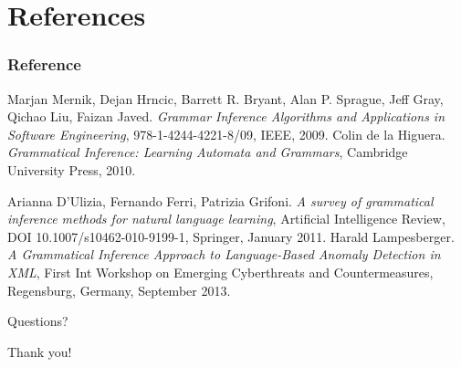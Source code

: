 \documentclass[11pt]{beamer}
\begin{document}
\section{References}

\begin{frame}[allowframebreaks]
  \frametitle<presentation>{Reference}
  \small
  \begin{thebibliography}{10}
    \beamertemplatebookbibitems
   Marjan Mernik, Dejan Hrncic, Barrett R. Bryant,
    Alan P. Sprague, Jeff Gray, Qichao Liu, Faizan Javed.
    \emph{Grammar Inference Algorithms and Applications in Software
      Engineering}, 978-1-4244-4221-8/09, IEEE, 2009.
   Colin de la Higuera.
    \emph{Grammatical Inference: Learning Automata and Grammars},
    Cambridge University Press, 2010.
 
    \beamertemplatearticlebibitems

   Arianna D'Ulizia, Fernando Ferri, Patrizia
    Grifoni.
    \emph{A survey of grammatical inference methods for natural
      language learning},
    Artificial Intelligence Review, DOI 10.1007/s10462-010-9199-1,
    Springer, January 2011.
   Harald Lampesberger. 
    \emph{A Grammatical Inference Approach to Language-Based Anomaly
      Detection in XML},
    First Int Workshop on Emerging Cyberthreats and Countermeasures,
    Regensburg, Germany, September 2013.
  \end{thebibliography}
\end{frame}

\begin{frame}
  \begin{center}
    Questions?
  \end{center}

  \vfill
  \pause
  \begin{center}
    Thank you!
  \end{center}
\end{frame}
\end{document}

